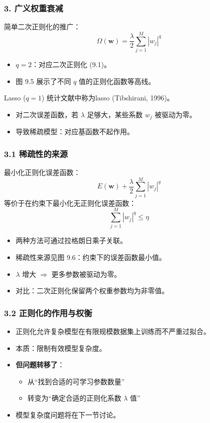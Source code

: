 \documentclass[t,aspectratio=169]{beamer} %
\begin{document}
\begin{frame}
    \frametitle{3. 广义权重衰减}
    简单二次正则化的推广：
    \begin{equation}
        \Omega(\mathbf{w}) = \frac{\lambda}{2} \sum_{j=1}^M |w_j|^q
        \tag{9.18}
    \end{equation}
    \begin{itemize}
        \item $q = 2$：对应二次正则化 (9.1)。
        \item 图 9.5 展示了不同 $q$ 值的正则化函数等高线。
    \end{itemize}
    \begin{block}{Lasso ($q = 1$)}
        统计文献中称为\alert{lasso} (Tibshirani, 1996)。
        \begin{itemize}
            \item 对二次误差函数，若 $\lambda$ 足够大，某些系数 $w_j$ 被驱动为零。
            \item 导致\alert{稀疏模型}：对应基函数不起作用。
        \end{itemize}
    \end{block}
\end{frame}

\begin{frame}
    \frametitle{3.1 稀疏性的来源}
    最小化正则化误差函数：
    \begin{equation}
        E(\mathbf{w}) + \frac{\lambda}{2} \sum_{j=1}^M |w_j|^q
        \tag{9.19}
    \end{equation}
    等价于在约束下最小化无正则化误差函数：
    \begin{equation}
        \sum_{j=1}^M |w_j|^q \leqslant \eta
        \tag{9.20}
    \end{equation}
    \begin{itemize}
        \item 两种方法可通过\alert{拉格朗日乘子}关联。
        \item 稀疏性来源见图 9.6：约束下的误差函数最小值。
        \item $\lambda$ 增大 $\Rightarrow$ 更多参数被驱动为零。
        \item 对比：二次正则化保留两个权重参数均为非零值。
    \end{itemize}
\end{frame}

\begin{frame}
    \frametitle{3.2 正则化的作用与权衡}
    \begin{itemize}
        \item 正则化允许复杂模型在\alert{有限规模数据集}上训练而不严重过拟合。
        \item 本质：\alert{限制有效模型复杂度}。
        \item \textbf{但问题转移了}：
        \begin{itemize}
            \item 从“找到合适的可学习参数数量”
            \item 转变为“确定合适的正则化系数 $\lambda$ 值”
        \end{itemize}
        \item 模型复杂度问题将在下一节讨论。
    \end{itemize}
\end{frame}
\end{document}
